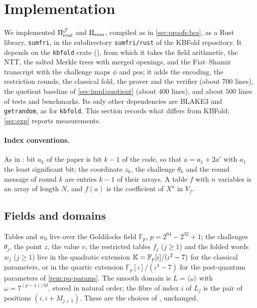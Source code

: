 \section{Implementation}\label{sec:impl}

We implemented $\Pi_{\mathrm{eval}}^{\mathcal{J}}$ and $\Pi_{\mathrm{sum}}$, compiled as in \cref{sec:proofs:bcs}, as a Rust library, \texttt{sumfri}, in the subdirectory \texttt{sumfri/rust} of the KBFold repository.
It depends on the \texttt{kbfold} crate (), from which it takes the field arithmetic, the NTT, the salted Merkle trees with merged openings, and the Fiat--Shamir transcript with the challenge maps $\phi$ and $\mathrm{pos}$; it adds the encoding, the restriction rounds, the classical fold, the prover and the verifier (about $700$ lines), the quotient baseline of \cref{sec:impl:quotient} (about $400$ lines), and about $500$ lines of tests and benchmarks.
Its only other dependencies are BLAKE3 and \texttt{getrandom}, as for \texttt{kbfold}.
This section records what differs from KBFold; \cref{sec:exp} reports measurements.

\paragraph{Index conventions.}
As in : bit $a_k$ of the paper is bit $k-1$ of the code, so that $a = a_1 + 2a'$ with $a_1$ the least significant bit; the coordinate $z_k$, the challenge $\theta_k$ and the round message of round $k$ are entries $k-1$ of their arrays.
A table $f$ with $n$ variables is an array of length $N$, and $f(a)$ is the coefficient of $X^a$ in $V_f$.

\subsection{Fields and domains}\label{sec:impl:fields}

Tables and $w_0$ live over the Goldilocks field $\mathbb{F}_p$, $p = 2^{64} - 2^{32} + 1$; the challenges $\theta_j$, the point $z$, the value $v$, the restricted tables $f_j$ ($j \ge 1$) and the folded words $w_j$ ($j \ge 1$) live in the quadratic extension $\mathbb{K} = \mathbb{F}_p[\iota]/(\iota^2 - 7)$ for the classical parameters, or in the quartic extension $\mathbb{F}_p[\iota]/(\iota^4 - 7)$ for the post-quantum parameters of \cref{rem:pq-params}.
The smooth domain is $L = \langle \omega \rangle$ with $\omega = 7^{(p-1)/M}$, stored in natural order; the fibre of index $i$ of $L_j$ is the pair of positions $(i, i + M_{j+1})$.
These are the choices of , unchanged.

